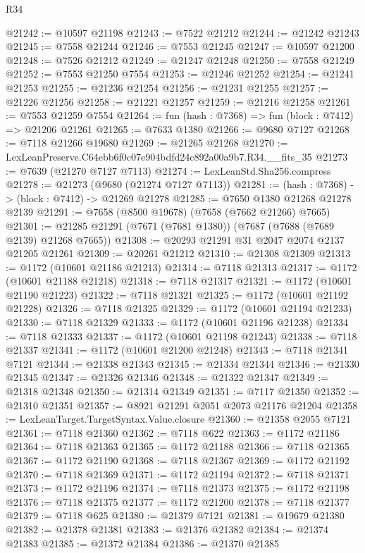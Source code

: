 \begin{lexlean}{R34}
\begin{coremodule}
@21242 := @10597 @21198
@21243 := @7522 @21212
@21244 := @21242 @21243
@21245 := @7558 @21244
@21246 := @7553 @21245
@21247 := @10597 @21200
@21248 := @7526 @21212
@21249 := @21247 @21248
@21250 := @7558 @21249
@21252 := @7553 @21250 @7554
@21253 := @21246 @21252
@21254 := @21241 @21253
@21255 := @21236 @21254
@21256 := @21231 @21255
@21257 := @21226 @21256
@21258 := @21221 @21257
@21259 := @21216 @21258
@21261 := @7553 @21259 @7554
@21264 := fun (hash : @7368) => fun (block : @7412) => @21206 @21261
@21265 := @7633 @1380
@21266 := @9680 @7127
@21268 := @7118 @21266 @19680
@21269 := @21265 @21268
@21270 := LexLeanPreserve.C64ebb6f0c07e904bdfd24c892a00a9b7.R34.__fits_35
@21273 := @7639 (@21270 @7127 @7113)
@21274 := LexLeanStd.Sha256.compress
@21278 := @21273 (@9680 (@21274 @7127 @7113))
@21281 := (hash : @7368) -> (block : @7412) -> @21269 @21278
@21285 := @7650 @1380 @21268 @21278 @2139
@21291 := @7658 (@8500 @19678) (@7658 (@7662 @21266) @7665)
@21301 := @21285 @21291 (@7671 (@7681 @1380)) (@7687 (@7688 (@7689 @2139) @21268 @7665))
@21308 := @20293 @21291 @31 @2047 @2074 @2137 @21205 @21261
@21309 := @20261 @21212
@21310 := @21308 @21309
@21313 := @1172 (@10601 @21186 @21213)
@21314 := @7118 @21313
@21317 := @1172 (@10601 @21188 @21218)
@21318 := @7118 @21317
@21321 := @1172 (@10601 @21190 @21223)
@21322 := @7118 @21321
@21325 := @1172 (@10601 @21192 @21228)
@21326 := @7118 @21325
@21329 := @1172 (@10601 @21194 @21233)
@21330 := @7118 @21329
@21333 := @1172 (@10601 @21196 @21238)
@21334 := @7118 @21333
@21337 := @1172 (@10601 @21198 @21243)
@21338 := @7118 @21337
@21341 := @1172 (@10601 @21200 @21248)
@21343 := @7118 @21341 @7121
@21344 := @21338 @21343
@21345 := @21334 @21344
@21346 := @21330 @21345
@21347 := @21326 @21346
@21348 := @21322 @21347
@21349 := @21318 @21348
@21350 := @21314 @21349
@21351 := @7117 @21350
@21352 := @21310 @21351
@21357 := @8921 @21291 @2051 @2073 @21176 @21204
@21358 := LexLeanTarget.TargetSyntax.Value.closure
@21360 := @21358 @2055 @7121
@21361 := @7118 @21360
@21362 := @7118 @622
@21363 := @1172 @21186
@21364 := @7118 @21363
@21365 := @1172 @21188
@21366 := @7118 @21365
@21367 := @1172 @21190
@21368 := @7118 @21367
@21369 := @1172 @21192
@21370 := @7118 @21369
@21371 := @1172 @21194
@21372 := @7118 @21371
@21373 := @1172 @21196
@21374 := @7118 @21373
@21375 := @1172 @21198
@21376 := @7118 @21375
@21377 := @1172 @21200
@21378 := @7118 @21377
@21379 := @7118 @625
@21380 := @21379 @7121
@21381 := @19679 @21380
@21382 := @21378 @21381
@21383 := @21376 @21382
@21384 := @21374 @21383
@21385 := @21372 @21384
@21386 := @21370 @21385

\end{coremodule}
\end{lexlean}
